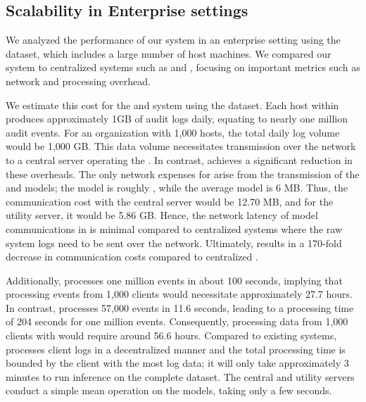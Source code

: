 

\subsection{Scalability in Enterprise settings}
\label{cost_metric}
We analyzed the performance of our system in an enterprise setting using the \optc dataset, which includes a large number of host machines. We compared our system to centralized systems such as \flash and \kairos, focusing on important metrics such as network and processing overhead.

 We estimate this cost for the \flash and \kairos system using the \optc dataset. Each host within \optc produces approximately 1GB of audit logs daily, equating to nearly one million audit events. For an organization with 1,000 hosts, the total daily log volume would be 1,000 GB. This data volume necessitates transmission over the network to a central server operating the \pids. In contrast, \Sys achieves a significant reduction in these overheads. The only network expenses for \Sys arise from the transmission of the \gnnshort and \wordvec models; the \gnnshort model is roughly \modelsize, while the average \wordvec model is 6 MB. Thus, the communication cost with the central server would be 12.70 MB, and for the utility server, it would be 5.86 GB. Hence, the network latency of model communications in \Sys is minimal compared to centralized systems where the raw system logs need to be sent over the network. Ultimately, \Sys results in a 170-fold decrease in communication costs compared to centralized \pids.

 Additionally, \flash processes one million events in about 100 seconds, implying that processing events from 1,000 clients would necessitate approximately 27.7 hours. In contrast, \kairos processes 57,000 events in 11.6 seconds, leading to a processing time of 204 seconds for one million events. Consequently, processing data from 1,000 clients with \kairos would require around 56.6 hours. Compared to existing systems, \Sys processes client logs in a decentralized manner and the total processing time is bounded by the client with the most log data; it will only take approximately 3 minutes to run inference on the complete \optc dataset. The central and utility servers conduct a simple mean operation on the models, taking only a few seconds.

